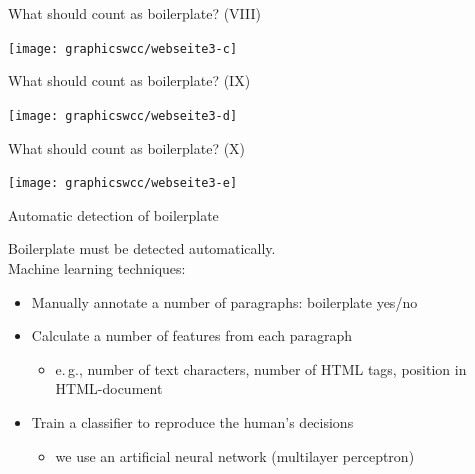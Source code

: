 \begin{frame}
  {What should count as boilerplate? (VIII)}
  \begin{center}
    \texttt{[image: graphicswcc/webseite3-c]}
  \end{center}
\end{frame}


\begin{frame}
  {What should count as boilerplate?  (IX)}
  \begin{center}
    \texttt{[image: graphicswcc/webseite3-d]}
  \end{center}
\end{frame}


\begin{frame}
  {What should count as boilerplate? (X)}
  \begin{center}
    \texttt{[image: graphicswcc/webseite3-e]}
  \end{center}
\end{frame}


\begin{frame}
{Automatic detection of boilerplate}

Boilerplate must be detected automatically.\\[2ex] %

Machine learning techniques:
\begin{itemize}
\item Manually annotate a number of paragraphs: boilerplate yes/no
\item Calculate a number of features from each paragraph
  \begin{itemize}
  \item e.\,g., number of text characters, number of HTML tags, position in HTML-document
  \end{itemize}
\item Train a classifier to reproduce the human's decisions 
  \begin{itemize}
  \item we use an artificial neural network (multilayer perceptron)
  \end{itemize}
\end{itemize}
\end{frame}


